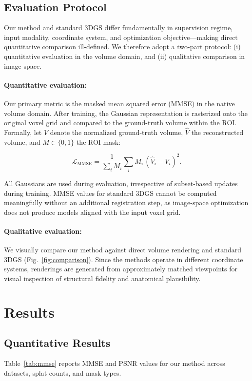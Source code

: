 \documentclass[runningheads]{llncs}
\begin{document}
\subsection{Evaluation Protocol}
\label{sec:evaluation}

Our method and standard 3DGS differ fundamentally in supervision regime, input modality, coordinate system, and optimization objective—making direct quantitative comparison ill-defined. We therefore adopt a two-part protocol: (i) quantitative evaluation in the volume domain, and (ii) qualitative comparison in image space.

\paragraph{Quantitative evaluation:}
Our primary metric is the masked mean squared error (MMSE) in the native volume domain. After training, the Gaussian representation is rasterized onto the original voxel grid and compared to the ground-truth volume within the ROI. Formally, let $V$ denote the normalized ground-truth volume, $\hat{V}$ the reconstructed volume, and $M \in \{0,1\}$ the ROI mask:

\begin{equation}
\mathcal{L}_{\mathrm{MMSE}} =
\frac{1}{\sum_i M_i}
\sum_i M_i \, (\hat{V}_i - V_i)^2.
\end{equation}

All Gaussians are used during evaluation, irrespective of subset-based updates during training. MMSE values for standard 3DGS cannot be computed meaningfully without an additional registration step, as image-space optimization does not produce models aligned with the input voxel grid.

\paragraph{Qualitative evaluation:}
We visually compare our method against direct volume rendering and standard 3DGS (Fig.~\ref{fig:comparison}). Since the methods operate in different coordinate systems, renderings are generated from approximately matched viewpoints for visual inspection of structural fidelity and anatomical plausibility.

\section{Results}



\subsection{Quantitative Results}
Table~\ref{tab:mmse} reports MMSE and PSNR values for our method across datasets, splat counts, and mask types.
\end{document}
